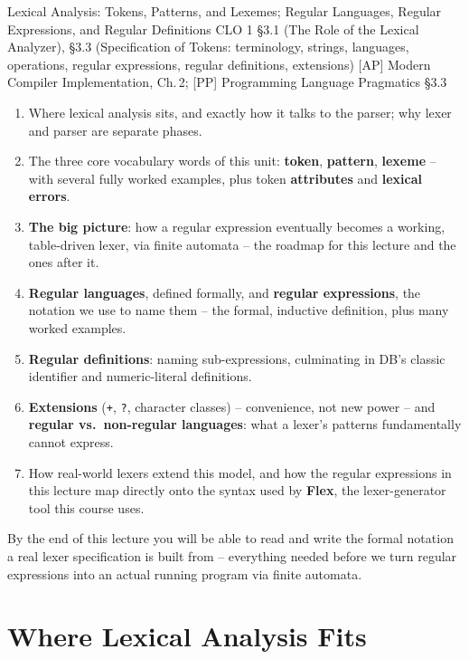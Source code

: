 \documentclass[full-course-notes.tex]{subfiles}
\begin{document}
  {Lexical Analysis: Tokens, Patterns, and Lexemes; Regular Languages, Regular Expressions,
   and Regular Definitions}
  {CLO 1}
  {\S3.1 (The Role of the Lexical Analyzer), \S3.3 (Specification of Tokens: terminology,
   strings, languages, operations, regular expressions, regular definitions, extensions)}
  {[AP] Modern Compiler Implementation, Ch.\,2; [PP] Programming Language Pragmatics \S3.3}
\setcounter{section}{0}
\makelecturetitle

\begin{coreidea}
\begin{enumerate}
  \item Where lexical analysis sits, and exactly how it talks to the parser; why lexer and
  parser are separate phases.
  \item The three core vocabulary words of this unit: \textbf{token}, \textbf{pattern},
  \textbf{lexeme} -- with several fully worked examples, plus token \textbf{attributes} and
  \textbf{lexical errors}.
  \item \textbf{The big picture}: how a regular expression eventually becomes a working,
  table-driven lexer, via finite automata -- the roadmap for this lecture and the ones after it.
  \item \textbf{Regular languages}, defined formally, and \textbf{regular expressions}, the
  notation we use to name them -- the formal, inductive definition, plus many worked examples.
  \item \textbf{Regular definitions}: naming sub-expressions, culminating in DB's classic
  identifier and numeric-literal definitions.
  \item \textbf{Extensions} (\texttt{+}, \texttt{?}, character classes) -- convenience, not new
  power -- and \textbf{regular vs.\ non-regular languages}: what a lexer's patterns fundamentally
  cannot express.
  \item How real-world lexers extend this model, and how the regular expressions in this
  lecture map directly onto the syntax used by \textbf{Flex}, the lexer-generator tool this
  course uses.
\end{enumerate}
By the end of this lecture you will be able to read and write the formal notation a real lexer
specification is built from -- everything needed before we turn regular expressions into an
actual running program via finite automata.
\end{coreidea}

\section{Where Lexical Analysis Fits}
\label{sec:l3-where-lexical-fits}
\end{document}
